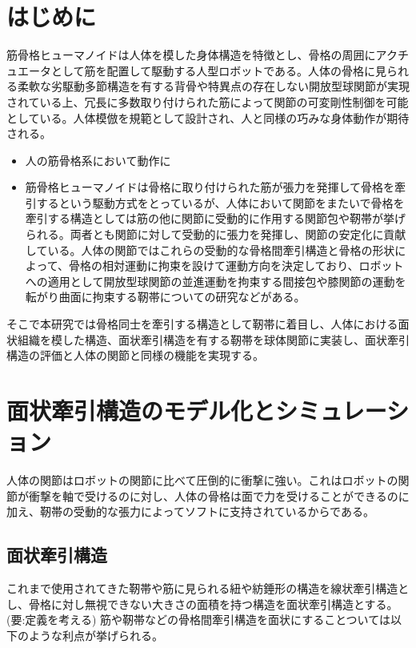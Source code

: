 \documentclass{jarticle}
\begin{document}
\small
\section{はじめに}
筋骨格ヒューマノイド\cite{SR2017:asano:design}は人体を模した身体構造を特徴とし、骨格の周囲にアクチュエータとして筋を配置して駆動する人型ロボットである。人体の骨格に見られる柔軟な劣駆動多節構造を有する背骨や特異点の存在しない開放型球関節が実現されている上、冗長に多数取り付けられた筋によって関節の可変剛性制御を可能としている。人体模倣を規範として設計され、人と同様の巧みな身体動作が期待される。
\begin{itemize}
\item 人の筋骨格系において動作に

\item 筋骨格ヒューマノイドは骨格に取り付けられた筋が張力を発揮して骨格を牽引するという駆動方式をとっているが、人体において関節をまたいで骨格を牽引する構造としては筋の他に関節に受動的に作用する関節包や靭帯が挙げられる。両者とも関節に対して受動的に張力を発揮し、関節の安定化に貢献している。人体の関節ではこれらの受動的な骨格間牽引構造と骨格の形状によって、骨格の相対運動に拘束を設けて運動方向を決定しており、ロボットへの適用として開放型球関節の並進運動を拘束する間接包\cite{Biorob2018:fujii:capsule}や膝関節の運動を転がり曲面に拘束する靭帯\cite{RoboSym:sonoda:ligaments}についての研究などがある。
\end{itemize}
そこで本研究では骨格同士を牽引する構造として靭帯に着目し、人体における面状組織を模した構造、面状牽引構造を有する靭帯を球体関節に実装し、面状牽引構造の評価と人体の関節と同様の機能を実現する。
\section{面状牽引構造のモデル化とシミュレーション}
人体の関節はロボットの関節に比べて圧倒的に衝撃に強い。これはロボットの関節が衝撃を軸で受けるのに対し、人体の骨格は面で力を受けることができるのに加え、靭帯の受動的な張力によってソフトに支持されているからである。
\subsection{面状牽引構造}
これまで使用されてきた靭帯や筋に見られる紐や紡錘形の構造を線状牽引構造とし、骨格に対し無視できない大きさの面積を持つ構造を面状牽引構造とする。(要:定義を考える)
筋や靭帯などの骨格間牽引構造を面状にすることついては以下のような利点が挙げられる。
\end{document}

